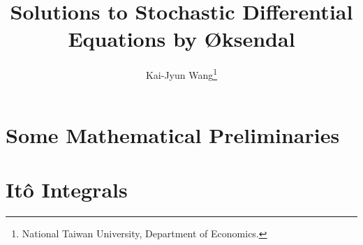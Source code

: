 \documentclass[a4paper, 12pt]{article}
\title{Solutions to Stochastic Differential Equations by \O ksendal}
\author{Kai-Jyun Wang\thanks{National Taiwan University, Department of Economics.}}
\date{}
\begin{document}
 
\maketitle


\tableofcontents
\newpage


\section{Some Mathematical Preliminaries}


\section{It\^o Integrals}

\end{document}
